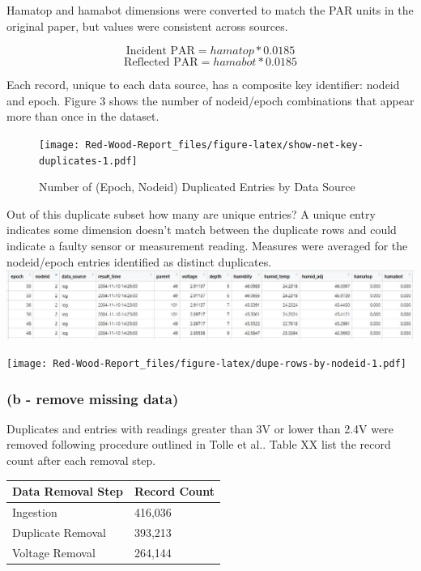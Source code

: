 \documentclass[
  twocolumn]{article}
\begin{document}
Hamatop and hamabot dimensions were converted to match the PAR units in
the original paper, but values were consistent across sources.

\[ \text{Incident PAR} = hamatop*0.0185 \]
\[ \text{Reflected PAR} = hamabot *0.0185 \]

Each record, unique to each data source, has a composite key identifier:
nodeid and epoch. Figure 3 shows the number of nodeid/epoch combinations
that appear more than once in the dataset.

\begin{figure}
\centering
\texttt{[image: Red-Wood-Report\_files/figure-latex/show-net-key-duplicates-1.pdf]}
\caption{Number of (Epoch, Nodeid) Duplicated Entries by Data Source}
\end{figure}

Out of this duplicate subset how many are unique entries? A unique entry
indicates some dimension doesn't match between the duplicate rows and
could indicate a faulty sensor or measurement reading. Measures were
averaged for the nodeid/epoch entries identified as distinct duplicates.
\includegraphics{./images/dupe_row.JPG}

\texttt{[image: Red-Wood-Report\_files/figure-latex/dupe-rows-by-nodeid-1.pdf]}

\hypertarget{b---remove-missing-data}{%
\subsubsection{(b - remove missing
data)}\label{b---remove-missing-data}}

Duplicates and entries with readings greater than 3V or lower than 2.4V
were removed following procedure outlined in Tolle et al.. Table XX list
the record count after each removal step.

\begin{longtable}[]{@{}ll@{}}
\toprule
Data Removal Step & Record Count \\
\midrule
\endhead
Ingestion & 416,036 \\
Duplicate Removal & 393,213 \\
Voltage Removal & 264,144 \\
\bottomrule
\end{longtable}
\end{document}
